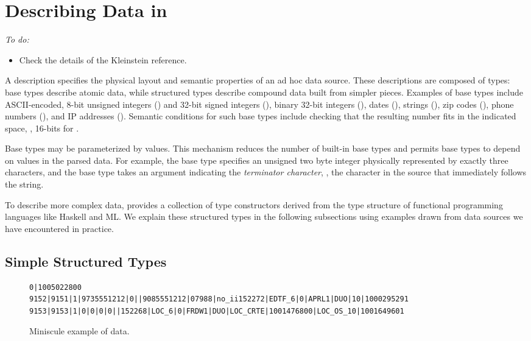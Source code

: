 \section{Describing Data in \padsmlbig{}}
\label{sec:padsml-overview}
{\em
To do:
\begin{itemize}
\item Check the details of the Kleinstein reference.
\end{itemize}
}
A \padsml{} description specifies the physical layout and semantic
properties of an ad hoc data source.  These descriptions are composed
of types: base types describe atomic data, while structured types
describe compound data built from simpler pieces.  Examples of base
types include ASCII-encoded, 8-bit unsigned integers () and
32-bit signed integers (), binary 32-bit integers (),
dates (), strings (), zip codes (),
phone numbers (), and IP addresses ().  Semantic
conditions for such base types include checking 
that the resulting number fits in the indicated space, \ie, 16-bits
for .

Base types may be parameterized by \ml{} values.  This mechanism
reduces the number of built-in base types and permits base types to
depend on values in the parsed data.  For example, the base type
 specifies an unsigned two byte integer physically
represented by exactly three characters, and the base type
 takes an argument indicating the \textit{terminator
character}, \ie{}, the character in the source that immediately
follows the string.

To describe more complex data, \padsml{} provides a collection of type
constructors derived from the type structure of functional programming
languages like Haskell and ML.  We explain these structured types in
the following subsections using examples drawn from data sources we
have encountered in practice.


\subsection{Simple Structured Types}


\begin{figure*}
{\scriptsize
\begin{verbatim}
0|1005022800
9152|9151|1|9735551212|0||9085551212|07988|no_ii152272|EDTF_6|0|APRL1|DUO|10|1000295291
9153|9153|1|0|0|0|0||152268|LOC_6|0|FRDW1|DUO|LOC_CRTE|1001476800|LOC_OS_10|1001649601
\end{verbatim}
}
  \caption{Miniscule example of \dibbler{} data.}
  \label{figure:dibbler-records}
\end{figure*}

